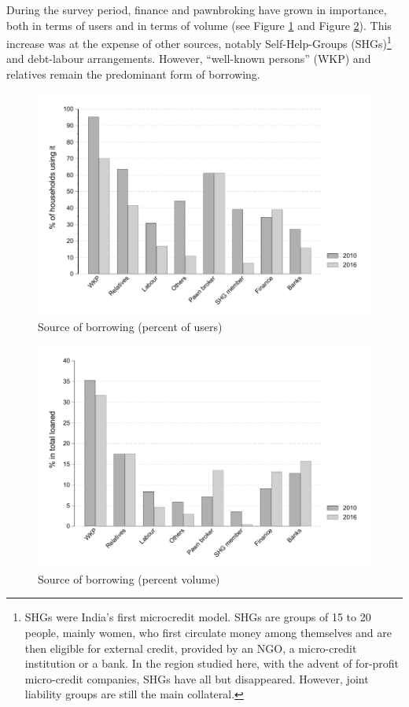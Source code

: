 \documentclass[a4paper, 11pt, onecolumn]{article}
\begin{document}
During the survey period, finance and pawnbroking have grown in importance, both in terms of users and in terms of volume (see Figure \ref{bar:clientele} and Figure \ref{bar:loaned}). This increase was at the expense of other sources, notably Self-Help-Groups (SHGs)\footnote{SHGs were India's first microcredit model. SHGs are groups of 15 to 20 people, mainly women, who first circulate money among themselves and are then eligible for external credit, provided by an NGO, a micro-credit institution or a bank. In the region studied here, with the advent of for-profit micro-credit companies, SHGs have all but disappeared. However, joint liability groups are still the main collateral.}  and debt-labour arrangements. However, ``well-known persons'' (WKP) and relatives remain the predominant form of borrowing.

\begin{figure}[ht]
\center
\includegraphics[width=12cm]{totalclientele.pdf}
\caption{Source of borrowing (percent of users)}
\label{bar:clientele}
\end{figure}

\begin{figure}[ht]
\center
\includegraphics[width=12cm]{totalloaned.pdf}
\caption{Source of borrowing (percent volume)}
\label{bar:loaned}
\end{figure}
\end{document}

